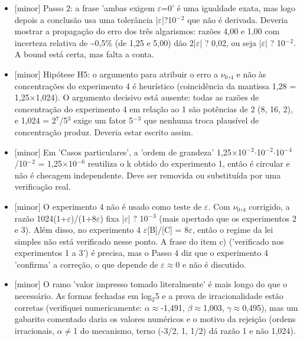 \documentclass{article}%
\begin{document}
\begin{itemize}%
\item%
{[}minor{]} Passo 2: a frase 'ambas exigem $\varepsilon$=0' é uma igualdade exata, mas logo depois a conclusão usa uma tolerância |$\varepsilon$|?10$^{-}$$^2$ que não é derivada. Deveria mostrar a propagação do erro dos três algarismos: razões 4,00 e 1,00 com incerteza relativa de \textasciitilde{}0,5\% (de 1,25 e 5,00) dão 2|$\varepsilon$| ? 0,02, ou seja |$\varepsilon$| ? 10$^{-}$$^2$. A bound está certa, mas falta a conta.%
\item%
{[}minor{]} Hipótese H5: o argumento para atribuir o erro a $\nu$$_{0}$,$_{4}$ e não às concentrações do experimento 4 é heurístico (coincidência da mantissa 1,28 = 1,25$\times$1,024). O argumento decisivo está ausente: todas as razões de concentração do experimento 4 em relação ao 1 são potências de 2 (8, 16, 2), e 1,024 = 2$^{7}$/5$^3$ exige um fator 5$^{-}$$^3$ que nenhuma troca plausível de concentração produz. Deveria estar escrito assim.%
\item%
{[}minor{]} Em 'Casos particulares', a 'ordem de grandeza' 1,25$\times$10$^{-}$$^2$$\cdot$10$^{-}$$^2$$\cdot$10$^{-}$$^{4}$/10$^{-}$$^2$ = 1,25$\times$10$^{-}$$^{6}$ reutiliza o k obtido do experimento 1, então é circular e não é checagem independente. Deve ser removida ou substituída por uma verificação real.%
\item%
{[}minor{]} O experimento 4 não é usado como teste de $\varepsilon$. Com $\nu$$_{0}$,$_{4}$ corrigido, a razão 1024(1+$\varepsilon$)/(1+8$\varepsilon$) fixa |$\varepsilon$| ? 10$^{-}$$^3$ (mais apertado que os experimentos 2 e 3). Além disso, no experimento 4 $\varepsilon${[}B{]}/{[}C{]} = 8$\varepsilon$, então o regime da lei simples não está verificado nesse ponto. A frase do item c) ('verificado nos experimentos 1 a 3') é precisa, mas o Passo 4 diz que o experimento 4 'confirma' a correção, o que depende de $\varepsilon$$\approx$0 e não é discutido.%
\item%
{[}minor{]} O ramo 'valor impresso tomado literalmente' é mais longo do que o necessário. As formas fechadas em log$_{2}$5 e a prova de irracionalidade estão corretas (verifiquei numericamente: $\alpha$$\approx$-1,491, $\beta$$\approx$1,003, $\gamma$$\approx$0,495), mas um gabarito comentado daria os valores numéricos e o motivo da rejeição (ordens irracionais, $\alpha$$\neq$1 do mecanismo, terno (-3/2, 1, 1/2) dá razão 1 e não 1,024).%
\end{itemize}%
\end{document}
